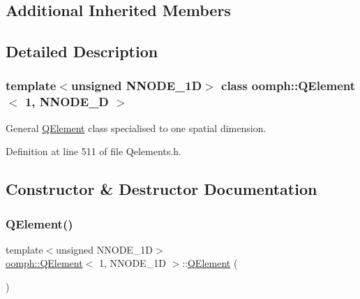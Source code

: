\subsection*{Additional Inherited Members}


\subsection{Detailed Description}
\subsubsection*{template$<$unsigned N\+N\+O\+D\+E\+\_\+1D$>$\newline
class oomph\+::\+Q\+Element$<$ 1, N\+N\+O\+D\+E\+\_\+D $>$}

General \hyperlink{classoomph_1_1QElement}{Q\+Element} class specialised to one spatial dimension. 

Definition at line 511 of file Qelements.\+h.



\subsection{Constructor \& Destructor Documentation}
\mbox{\label{classoomph_1_1QElement_3_011_00_01NNODE__1D_01_4_a11fafdcbce81bce6c8420bb828afd448}} 
\subsubsection{\texorpdfstring{Q\+Element()}{QElement()}\hspace{0.1cm}{\footnotesize\ttfamily [1/2]}}
{\footnotesize\ttfamily template$<$unsigned N\+N\+O\+D\+E\+\_\+1D$>$ \\
\hyperlink{classoomph_1_1QElement}{oomph\+::\+Q\+Element}$<$ 1, N\+N\+O\+D\+E\+\_\+1D $>$\+::\hyperlink{classoomph_1_1QElement}{Q\+Element} (\begin{DoxyParamCaption}{ }\end{DoxyParamCaption})\hspace{0.3cm}{\ttfamily [inline]}}




